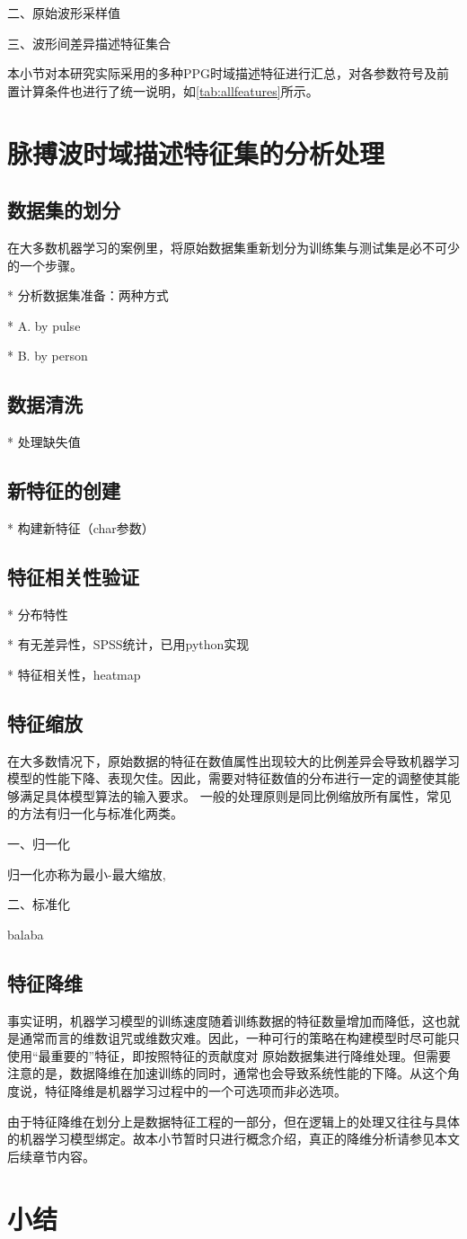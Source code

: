 二、原始波形采样值


三、波形间差异描述特征集合


本小节对本研究实际采用的多种PPG时域描述特征进行汇总，对各参数符号及前置计算条件也进行了统一说明，如\autoref{tab:allfeatures}所示。

\section{脉搏波时域描述特征集的分析处理}
\subsection{数据集的划分}
在大多数机器学习的案例里，将原始数据集重新划分为训练集与测试集是必不可少的一个步骤。

* 分析数据集准备：两种方式

  * A. by pulse

  * B. by person

\subsection{数据清洗}
* 处理缺失值

\subsection{新特征的创建}
* 构建新特征（char参数）
\subsection{特征相关性验证}
* 分布特性

  * 有无差异性，SPSS统计，已用python实现

  * 特征相关性，heatmap
\subsection{特征缩放}
在大多数情况下，原始数据的特征在数值属性出现较大的比例差异会导致机器学习模型的性能下降、表现欠佳\cite{Aurélien2018}。因此，需要对特征数值的分布进行一定的调整使其能够满足具体模型算法的输入要求。
一般的处理原则是同比例缩放所有属性，常见的方法有归一化与标准化两类。

一、归一化

归一化亦称为最小-最大缩放,

二、标准化

balaba
\subsection{特征降维}
事实证明，机器学习模型的训练速度随着训练数据的特征数量增加而降低，这也就是通常而言的维数诅咒或维数灾难。因此，一种可行的策略在构建模型时尽可能只使用“最重要的”特征，即按照特征的贡献度对
原始数据集进行降维处理。但需要注意的是，数据降维在加速训练的同时，通常也会导致系统性能的下降。从这个角度说，特征降维是机器学习过程中的一个可选项而非必选项。

由于特征降维在划分上是数据特征工程的一部分，但在逻辑上的处理又往往与具体的机器学习模型绑定。故本小节暂时只进行概念介绍，真正的降维分析请参见本文后续章节内容。
\section{小结}